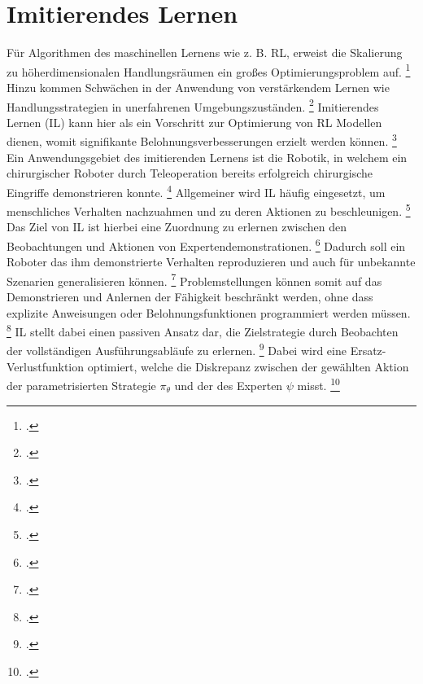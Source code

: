 \section{Imitierendes Lernen}

Für Algorithmen des maschinellen Lernens wie z. B. RL, erweist die Skalierung zu höherdimensionalen Handlungsräumen ein großes Optimierungsproblem auf. \footcite[Vgl.][S. 3]{Hussein.2017}
Hinzu kommen Schwächen in der Anwendung von verstärkendem Lernen wie Handlungsstrategien in unerfahrenen Umgebungszuständen. \footcite[Vgl.][S. 1]{attia.2018}
Imitierendes Lernen (IL) kann hier als ein Vorschritt zur Optimierung von RL Modellen dienen, womit signifikante Belohnungsverbesserungen erzielt werden können. \footcite[Vgl.][S. 4]{Hussein.2017}
Ein Anwendungsgebiet des imitierenden Lernens ist die Robotik, in welchem ein chirurgischer Roboter durch Teleoperation bereits erfolgreich chirurgische Eingriffe demonstrieren konnte. \footcite[Vgl.][]{gao.2014}
Allgemeiner wird IL häufig eingesetzt, um menschliches Verhalten nachzuahmen und zu deren Aktionen zu beschleunigen. \footcite[Vgl.][S. 1]{attia.2018}
Das Ziel von IL ist hierbei eine Zuordnung zu erlernen zwischen den Beobachtungen und Aktionen von Expertendemonstrationen. \footcite[Vgl.][S. 1]{Hussein.2017}
Dadurch soll ein Roboter das ihm demonstrierte Verhalten reproduzieren und auch für unbekannte Szenarien generalisieren können. \footcite[Vgl.][S. 365]{fang.2019}
Problemstellungen können somit auf das Demonstrieren und Anlernen der Fähigkeit beschränkt werden, ohne dass explizite Anweisungen oder Belohnungsfunktionen programmiert werden müssen. \footcite[Vgl.][S. 1]{Hussein.2017}
IL stellt dabei einen passiven Ansatz dar, die Zielstrategie durch Beobachten der vollständigen Ausführungsabläufe zu erlernen. \footcite[Vgl.][S. 2]{attia.2018}
Dabei wird eine Ersatz-Verlustfunktion optimiert, welche die Diskrepanz zwischen der gewählten Aktion der parametrisierten Strategie $\pi_{\theta}$ und der des Experten $\psi$ misst. \footcite[Vgl.][S. 2f.]{Ashwin.2020}

